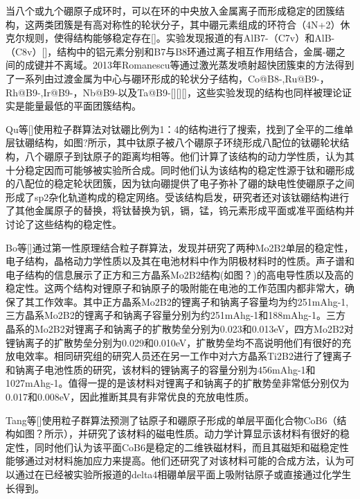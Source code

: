 \documentclass[phd,nobackinfo]{scutthesis}
\begin{document}
当八个或九个硼原子成环时，可以在环的中央放入金属离子而形成稳定的团簇结构，这两类团簇是有高对称性的轮状分子，其中硼元素组成的环符合（4N+2）休克尔规则，使得结构能够稳定存在[]。实验发现报道的有AlB7-（C7v）和AlB-（C8v）[]，结构中的铝元素分别和B7与B8环通过离子相互作用结合，金属-硼之间的成键并不离域。2013年Romanescu等通过激光蒸发喷射超快团簇束的方法得到了一系列由过渡金属为中心与硼环形成的轮状分子结构，Co@B8-,Ru@B9-，Rh@B9-,Ir@B9-，Nb@B9-以及Ta@B9-[][][]，这些实验发现的结构也同样被理论证实是能量最低的平面团簇结构。

Qu等[]使用粒子群算法对钛硼比例为1：4的结构进行了搜索，找到了全平的二维单层钛硼结构，如图?所示，其中钛原子被八个硼原子环绕形成八配位的钛硼轮状结构，八个硼原子到钛原子的距离均相等。他们计算了该结构的动力学性质，认为其十分稳定因而可能够被实验所合成。同时他们认为该结构的稳定性源于钛和硼形成的八配位的稳定轮状团簇，因为钛向硼提供了电子弥补了硼的缺电性使硼原子之间形成了sp2杂化轨道构成的稳定网络。受该结构启发，研究者还对该钛硼结构进行了其他金属原子的替换，将钛替换为钒，镉，锰，钨元素形成平面或准平面结构并讨论了这些结构的稳定性。

Bo等[]通过第一性原理结合粒子群算法，发现并研究了两种Mo2B2单层的稳定性，电子结构，晶格动力学性质以及其在电池材料中作为阴极材料时的性质。声子谱和电子结构的信息展示了正方和三方晶系Mo2B2结构(如图？)的高电导性质以及高的稳定性。这两个结构对锂原子和钠原子的吸附能在电池的工作范围内都非常大，确保了其工作效率。其中正方晶系Mo2B2的锂离子和钠离子容量均为约251mAhg-1, 三方晶系Mo2B2的锂离子和钠离子容量分别为约251mAhg-1和188mAhg-1。三方晶系的Mo2B2对锂离子和钠离子的扩散势垒分别为0.023和0.013eV，四方Mo2B2对锂钠离子的扩散势垒分别为0.029和0.010eV，扩散势垒均不高说明他们有很好的充放电效率。相同研究组的研究人员还在另一工作中对六方晶系Ti2B2进行了锂离子和钠离子电池性质的研究，该材料的锂钠离子的容量分别为456mAhg-1和1027mAhg-1。值得一提的是该材料对锂离子和钠离子的扩散势垒非常低分别仅为0.017和0.008eV，因此推断其具有非常优良的充放电性质。

Tang等[]使用粒子群算法预测了钴原子和硼原子形成的单层平面化合物CoB6（结构如图？所示），并研究了该材料的磁电性质。动力学计算显示该材料有很好的稳定性，同时他们认为该平面CoB6是稳定的二维铁磁材料，而且其磁矩和磁稳定性能够通过对材料施加应力来提高。他们还研究了对该材料可能的合成方法，认为可以通过在已经被实验所报道的delta4相硼单层平面上吸附钴原子或直接通过化学生长得到。
\end{document}
